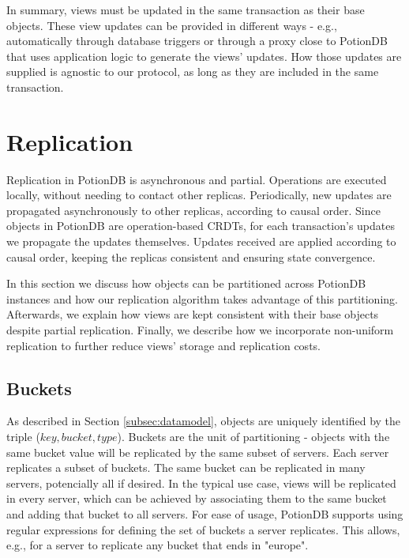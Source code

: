 \documentclass{vldb}
\begin{document}
In summary, views must be updated in the same transaction as their base objects.
These view updates can be provided in different ways - e.g., automatically through database triggers \cite{oracleTriggers, dbtoaster} or through a proxy close to PotionDB that uses application logic to generate the views' updates.
How those updates are supplied is agnostic to our protocol, as long as they are included in the same transaction.

\section{Replication}
\label{sec:replication}
Replication in PotionDB is asynchronous and partial.
Operations are executed locally, without needing to contact other replicas.
Periodically, new updates are propagated asynchronously to other replicas, according to causal order.
Since objects in PotionDB are operation-based CRDTs, for each transaction's updates we propagate the updates themselves.
Updates received are applied according to causal order, keeping the replicas consistent and ensuring state convergence.

In this section we discuss how objects can be partitioned across PotionDB instances and how our replication algorithm takes advantage of this partitioning.
Afterwards, we explain how views are kept consistent with their base objects despite partial replication.
Finally, we describe how we incorporate non-uniform replication to further reduce views' storage and replication costs.

\subsection{Buckets}
\label{subsec:buckets}
As described in Section \ref{subsec:datamodel}, objects are uniquely identified by the triple ($key, bucket, type$).
Buckets are the unit of partitioning - objects with the same bucket value will be replicated by the same subset of servers.
Each server replicates a subset of buckets.
The same bucket can be replicated in many servers, potencially all if desired.
In the typical use case, views will be replicated in every server, which can be achieved by associating them to the same bucket and adding that bucket to all servers.
For ease of usage, PotionDB supports using regular expressions for defining the set of buckets a server replicates.
This allows, e.g., for a server to replicate any bucket that ends in "europe".
\end{document}
